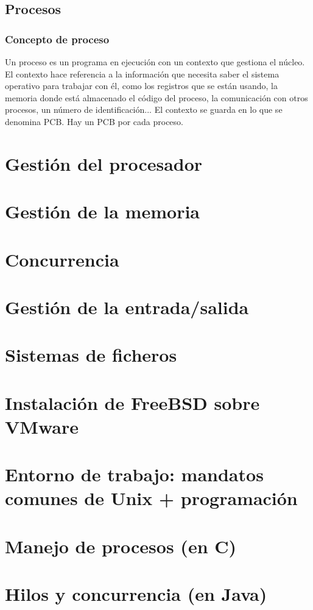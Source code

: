 \documentclass[10pt]{book}
\begin{document}
\section{Procesos}

\subsection{Concepto de proceso}

Un proceso es un programa en ejecución con un contexto que gestiona el núcleo. El contexto hace referencia a la información que necesita saber el sistema operativo para trabajar con él, como los registros que se están usando, la memoria donde está almacenado el código del proceso, la comunicación con otros procesos, un número de identificación... El contexto se guarda en lo que se denomina PCB. Hay un PCB por cada proceso.

\chapter{Gestión del procesador}


\chapter{Gestión de la memoria}


\chapter{Concurrencia}


\chapter{Gestión de la entrada/salida}


\chapter{Sistemas de ficheros}

\appendix


\chapter{Instalación de FreeBSD sobre VMware}

\chapter{Entorno de trabajo: mandatos comunes de Unix + programación}

\chapter{Manejo de procesos (en C)}

\chapter{Hilos y concurrencia (en Java)}
\end{document}
